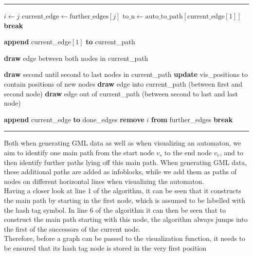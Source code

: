 \documentclass[a4paper,12pt,twoside,BCOR=10mm]{scrbook}
\makeatletter
\newenvironment{breakablealgorithm}
  {%
   \begin{center}
     \refstepcounter{algorithm}%
     \hrule height.8pt depth0pt \vspace{-0.45cm} \kern2pt%
     \renewcommand{\caption}[2][\relax]{%
       {\raggedright\textbf{\ALG@name~\thealgorithm} ##2\par}%
       \ifx\relax##1\relax %
         \addcontentsline{loa}{algorithm}{\protect\numberline{\thealgorithm}##2}%
       \else %
         \addcontentsline{loa}{algorithm}{\protect\numberline{\thealgorithm}##1}%
       \fi
       \kern2pt\hrule\kern2pt
     }
  }{%
     \kern2pt\hrule\relax%
   \end{center}
  }
\makeatother
\begin{document}
\begin{breakablealgorithm}
\begin{algorithmic}[1]
						\State $ i \gets j $
						\State $ \textrm{current\_edge} \gets \textrm{further\_edges}[ j ] $
						\State $ \textrm{to\_n} \gets \textrm{auto\_to\_path}[ \textrm{current\_edge}[ 1 ] ] $
						\State \textbf{break}
					\EndIf
				\EndFor
			\EndWhile

			\State \textbf{append} current\_edge$[ 1 ]$ \textbf{to} current\_path

				
				\State \textbf{draw} edge between both nodes in current\_path

			\Else

				\State \textbf{draw} second until second to last nodes in current\_path
				\State \textbf{update} vis\_positions to contain positions of new nodes
				\State \textbf{draw} edge into current\_path (between first and second node)
				\State \textbf{draw} edge out of current\_path (between second to last and last node)

			\EndIf

			\State \textbf{append} current\_edge \textbf{to} done\_edges
			\State \textbf{remove} $ i $ \textbf{from} further\_edges
			\State \textbf{break}
		\EndIf
	\EndFor

\EndWhile

\end{algorithmic}
\end{breakablealgorithm}
Both when generating GML data as well as when visualizing an automaton, 
we aim to identify one main path from the start node $ v_s $ to the end node $ v_e $, 
and to then identify further paths lying off this main path. When generating GML data, 
these additional paths are added as infoblocks, while we add them as paths of nodes on 
different horizontal lines when visualizing the automaton. \\
Having a closer look at line 1 of the algorithm, 
it can be seen that it constructs the main path 
by starting in the first node, which is assumed to 
be labelled with the hash tag symbol. 
In line 6 of the algorithm it can then be seen 
that to construct the main path starting with this node, 
the algorithm always jumps into the first of the successors of the current node. \\
Therefore, before a graph can be passed to the visualization function, 
it needs to be ensured that its hash tag node is stored in the very first position 
\end{document}
